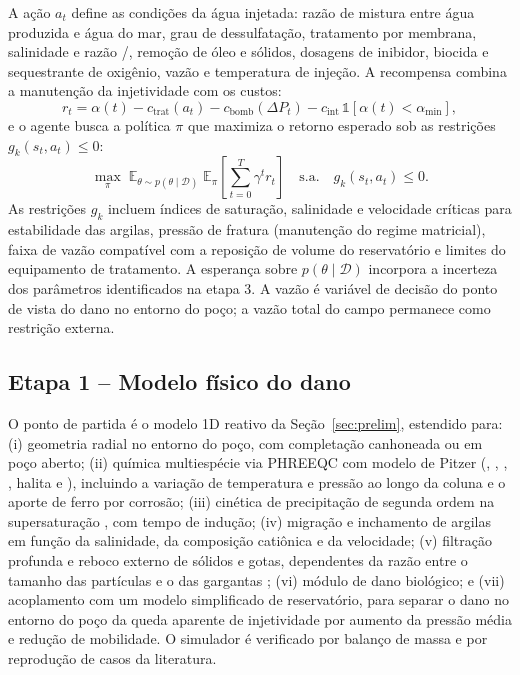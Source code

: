 \documentclass[11pt,a4paper]{article}
\begin{document}
A ação $a_t$ define as condições da água injetada: razão de mistura entre água produzida e
água do mar, grau de dessulfatação, tratamento por membrana, salinidade e razão
/, remoção de óleo e sólidos, dosagens de inibidor, biocida e
sequestrante de oxigênio, vazão e temperatura de injeção. A recompensa combina a
manutenção da injetividade com os custos:
\begin{equation}
r_t = \alpha(t) - c_{\mathrm{trat}}(a_t) - c_{\mathrm{bomb}}(\Delta P_t) - c_{\mathrm{int}}\,\mathbb{1}[\alpha(t) < \alpha_{\min}],
\end{equation}
e o agente busca a política $\pi$ que maximiza o retorno esperado sob as restrições
$g_k(s_t,a_t)\le 0$:
\begin{equation}
\max_{\pi}\; \mathbb{E}_{\theta \sim p(\theta\mid\mathcal{D})}\;\mathbb{E}_{\pi}\!\left[\sum_{t=0}^{T} \gamma^{t} r_t\right]
\quad \text{s.a.} \quad g_k(s_t,a_t)\le 0 .
\end{equation}
As restrições $g_k$ incluem índices de saturação, salinidade e velocidade críticas para
estabilidade das argilas, pressão de fratura (manutenção do regime matricial), faixa de
vazão compatível com a reposição de volume do reservatório e limites do equipamento de
tratamento. A esperança sobre $p(\theta\mid\mathcal{D})$ incorpora a incerteza dos
parâmetros identificados na etapa 3. A vazão é variável de decisão do ponto de vista do
dano no entorno do poço; a vazão total do campo permanece como restrição externa.

\subsection{Etapa 1 -- Modelo físico do dano}
O ponto de partida é o modelo 1D reativo da Seção~\ref{sec:prelim}, estendido para:
(i) geometria radial no entorno do poço, com completação canhoneada ou em poço aberto;
(ii) química multiespécie via PHREEQC com modelo de Pitzer (, ,
, , halita e ), incluindo a variação de temperatura e
pressão ao longo da coluna e o aporte de ferro por corrosão; (iii) cinética de
precipitação de segunda ordem na supersaturação \cite{nancollas1975}, com tempo de
indução; (iv) migração e inchamento de argilas em função da salinidade, da composição
catiônica e da velocidade; (v) filtração profunda e reboco externo de sólidos e gotas,
dependentes da razão entre o tamanho das partículas e o das gargantas
\cite{pangsharma1997,bedrikovetsky2001}; (vi) módulo de dano biológico; e (vii) acoplamento
com um modelo simplificado de reservatório, para separar o dano no entorno do poço da
queda aparente de injetividade por aumento da pressão média e redução de mobilidade.
O simulador é verificado por balanço de massa e por reprodução de casos da literatura.
\end{document}

